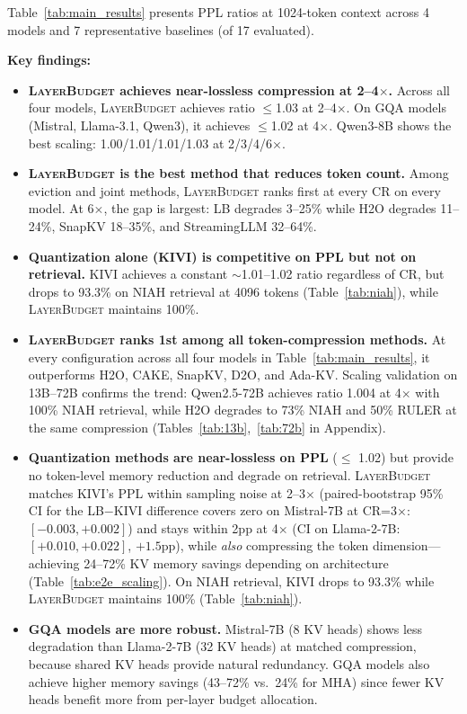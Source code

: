 \documentclass{article}
\newcommand{\layerbudget}{\textsc{LayerBudget}\xspace}
\begin{document}
Table~\ref{tab:main_results} presents PPL ratios at 1024-token context across 4 models and 7 representative baselines (of 17 evaluated).

\textbf{Key findings:}
\begin{itemize}
    \item \textbf{\layerbudget achieves near-lossless compression at 2--4$\times$.}
    Across all four models, \layerbudget achieves ratio $\leq$1.03 at 2--4$\times$.
    On GQA models (Mistral, Llama-3.1, Qwen3), it achieves $\leq$1.02 at 4$\times$.
    Qwen3-8B shows the best scaling: 1.00/1.01/1.01/1.03 at 2/3/4/6$\times$.
    \item \textbf{\layerbudget is the best method that reduces token count.}
    Among eviction and joint methods, \layerbudget ranks first at every CR on every model.
    At 6$\times$, the gap is largest: LB degrades 3--25\% while H2O degrades 11--24\%, SnapKV 18--35\%, and StreamingLLM 32--64\%.
    \item \textbf{Quantization alone (KIVI) is competitive on PPL but not on retrieval.}
    KIVI achieves a constant $\sim$1.01--1.02 ratio regardless of CR, but drops to 93.3\% on NIAH retrieval at 4096 tokens (Table~\ref{tab:niah}), while \layerbudget maintains 100\%.
    \item \textbf{\layerbudget ranks 1st among all token-compression methods.}
    At every configuration across all four models in Table~\ref{tab:main_results}, it outperforms H2O, CAKE, SnapKV, D2O, and Ada-KV.
    Scaling validation on 13B--72B confirms the trend: Qwen2.5-72B achieves ratio 1.004 at 4$\times$ with 100\% NIAH retrieval, while H2O degrades to 73\% NIAH and 50\% RULER at the same compression (Tables~\ref{tab:13b},~\ref{tab:72b} in Appendix).
    \item \textbf{Quantization methods are near-lossless on PPL} ($\leq$ 1.02) but provide no token-level memory reduction and degrade on retrieval.
    \layerbudget matches KIVI's PPL within sampling noise at 2--3$\times$ (paired-bootstrap 95\% CI for the LB$-$KIVI difference covers zero on Mistral-7B at CR=3$\times$: $[-0.003, +0.002]$) and stays within 2pp at 4$\times$ (CI on Llama-2-7B: $[+0.010, +0.022]$, $+1.5$pp), while \emph{also} compressing the token dimension---achieving 24--72\% KV memory savings depending on architecture (Table~\ref{tab:e2e_scaling}).
    On NIAH retrieval, KIVI drops to 93.3\% while \layerbudget maintains 100\% (Table~\ref{tab:niah}).
    \item \textbf{GQA models are more robust.} Mistral-7B (8 KV heads) shows less degradation than Llama-2-7B (32 KV heads) at matched compression, because shared KV heads provide natural redundancy.
    GQA models also achieve higher memory savings (43--72\% vs.\ 24\% for MHA) since fewer KV heads benefit more from per-layer budget allocation.
\end{itemize}
\end{document}
